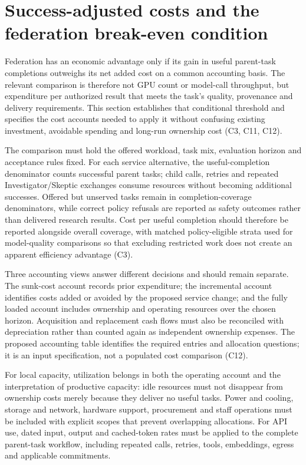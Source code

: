 \documentclass[11pt]{article}
\begin{document}
\section{Success-adjusted costs and the federation break-even condition}
Federation has an economic advantage only if its gain in useful parent-task completions outweighs its net added cost on a common accounting basis. The relevant comparison is therefore not GPU count or model-call throughput, but expenditure per authorized result that meets the task\textquoteright{}s quality, provenance and delivery requirements. This section establishes that conditional threshold and specifies the cost accounts needed to apply it without confusing existing investment, avoidable spending and long-run ownership cost (C3, C11, C12).

The comparison must hold the offered workload, task mix, evaluation horizon and acceptance rules fixed. For each service alternative, the useful-completion denominator counts successful parent tasks; child calls, retries and repeated Investigator/Skeptic exchanges consume resources without becoming additional successes. Offered but unserved tasks remain in completion-coverage denominators, while correct policy refusals are reported as safety outcomes rather than delivered research results. Cost per useful completion should therefore be reported alongside overall coverage, with matched policy-eligible strata used for model-quality comparisons so that excluding restricted work does not create an apparent efficiency advantage (C3).

Three accounting views answer different decisions and should remain separate. The sunk-cost account records prior expenditure; the incremental account identifies costs added or avoided by the proposed service change; and the fully loaded account includes ownership and operating resources over the chosen horizon. Acquisition and replacement cash flows must also be reconciled with depreciation rather than counted again as independent ownership expenses. The proposed accounting table identifies the required entries and allocation questions; it is an input specification, not a populated cost comparison (C12).

For local capacity, utilization belongs in both the operating account and the interpretation of productive capacity: idle resources must not disappear from ownership costs merely because they deliver no useful tasks. Power and cooling, storage and network, hardware support, procurement and staff operations must be included with explicit scopes that prevent overlapping allocations. For API use, dated input, output and cached-token rates must be applied to the complete parent-task workflow, including repeated calls, retries, tools, embeddings, egress and applicable commitments.
\end{document}
